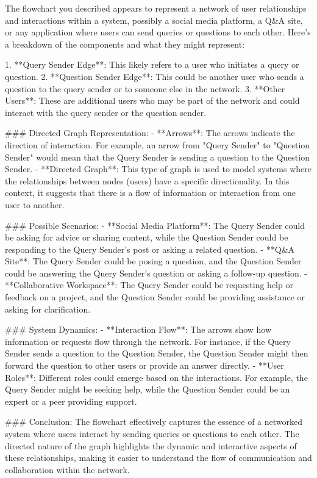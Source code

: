 The flowchart you described appears to represent a network of user relationships and interactions within a system, possibly a social media platform, a Q&A site, or any application where users can send queries or questions to each other. Here's a breakdown of the components and what they might represent:

1. **Query Sender Edge**: This likely refers to a user who initiates a query or question.
2. **Question Sender Edge**: This could be another user who sends a question to the query sender or to someone else in the network.
3. **Other Users**: These are additional users who may be part of the network and could interact with the query sender or the question sender.

### Directed Graph Representation:
- **Arrows**: The arrows indicate the direction of interaction. For example, an arrow from "Query Sender" to "Question Sender" would mean that the Query Sender is sending a question to the Question Sender.
- **Directed Graph**: This type of graph is used to model systems where the relationships between nodes (users) have a specific directionality. In this context, it suggests that there is a flow of information or interaction from one user to another.

### Possible Scenarios:
- **Social Media Platform**: The Query Sender could be asking for advice or sharing content, while the Question Sender could be responding to the Query Sender’s post or asking a related question.
- **Q&A Site**: The Query Sender could be posing a question, and the Question Sender could be answering the Query Sender’s question or asking a follow-up question.
- **Collaborative Workspace**: The Query Sender could be requesting help or feedback on a project, and the Question Sender could be providing assistance or asking for clarification.

### System Dynamics:
- **Interaction Flow**: The arrows show how information or requests flow through the network. For instance, if the Query Sender sends a question to the Question Sender, the Question Sender might then forward the question to other users or provide an answer directly.
- **User Roles**: Different roles could emerge based on the interactions. For example, the Query Sender might be seeking help, while the Question Sender could be an expert or a peer providing support.

### Conclusion:
The flowchart effectively captures the essence of a networked system where users interact by sending queries or questions to each other. The directed nature of the graph highlights the dynamic and interactive aspects of these relationships, making it easier to understand the flow of communication and collaboration within the network.